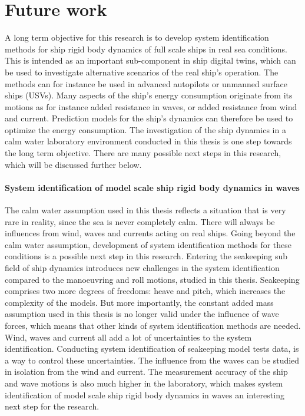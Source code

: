 \chapter{Future work\label{ch:future_work}}
A long term objective for this research is to develop system identification methods for ship rigid body dynamics of full scale ships in real sea conditions. This is intended as an important sub-component in ship digital twins, which can be used to investigate alternative scenarios of the real ship's operation. The methods can for instance be used in advanced autopilots or unmanned surface ships (USVs). Many aspects of the ship's energy consumption originate from its motions as for instance added resistance in waves, or added resistance from wind and current. Prediction models for the ship's dynamics can therefore be used to optimize the energy consumption. The investigation of the ship dynamics in a calm water laboratory environment conducted in this thesis is one step towards the long term objective. There are many possible next steps in this research, which will be discussed further below.  

\subsubsection*{System identification of model scale ship rigid body dynamics in waves}
The calm water assumption used in this thesis reflects a situation that is very rare in reality, since the sea is never completely calm. There will always be influences from wind, waves and currents acting on real ships. Going beyond the calm water assumption, development of system identification methods for these conditions is a possible next step in this research. Entering the seakeeping sub field of ship dynamics introduces new challenges in the system identification compared to the manoeuvring and roll motions, studied in this thesis. Seakeeping comprises two more degrees of freedoms: heave and pitch, which increases the complexity of the models. But more importantly, the constant added mass assumption used in this thesis is no longer valid under the influence of wave forces, which means that other kinds of system identification methods are needed. Wind, waves and current all add a lot of uncertainties to the system identification. Conducting system identification of seakeeping model tests data, is a way to control these uncertainties. The influence from the waves can be studied in isolation from the wind and current. The measurement accuracy of the ship and wave motions is also much higher in the laboratory, which makes system identification of model scale ship rigid body dynamics in waves an interesting next step for the research.  

